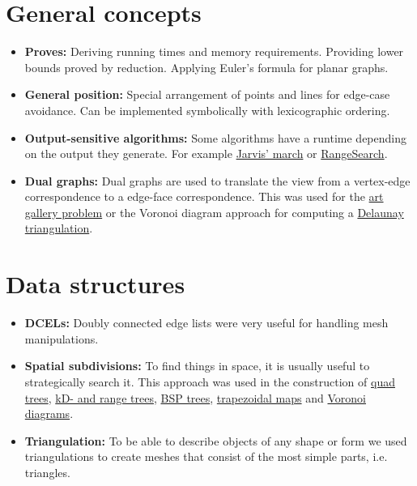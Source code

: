 \section{General concepts}
    \begin{itemize}
        \item \textbf{Proves:} Deriving running times and memory requirements. Providing lower bounds proved by reduction. Applying Euler's formula for planar graphs.

        \item \textbf{General position:} Special arrangement of points and lines for edge-case avoidance. Can be implemented symbolically with lexicographic ordering. 

        \item \textbf{Output-sensitive algorithms:} Some algorithms have a runtime depending on the output they generate. For example \hyperref[alg:convex_hull_jarvis]{Jarvis' march} or \hyperref[alg:kdtree_rangesearch]{RangeSearch}.

        \item \textbf{Dual graphs:} Dual graphs are used to translate the view from a vertex-edge correspondence to a edge-face correspondence. This was used for the \hyperref[ch:polygon_triangulation]{art gallery problem} or the Voronoi diagram approach for computing a \hyperref[ch:delaunay_triangulation]{Delaunay triangulation}.
    \end{itemize}

\section{Data structures}
    \begin{itemize}
        \item \textbf{DCELs:} Doubly connected edge lists were very useful for handling mesh manipulations.

        \item \textbf{Spatial subdivisions:} To find things in space, it is usually useful to strategically search it. This approach was used in the construction of \hyperref[ch:quadtrees]{quad trees}, \hyperref[ch:range-_and_kd-trees]{kD- and range trees}, \hyperref[ch:bsptrees]{BSP trees}, \hyperref[ch:point_location]{trapezoidal maps} and \hyperref[ch:voronoi_diagrams]{Voronoi diagrams}.

        \item \textbf{Triangulation:} To be able to describe objects of any shape or form we used triangulations to create meshes that consist of the most simple parts, i.e. triangles. 
    \end{itemize}

